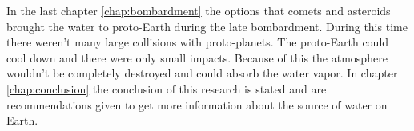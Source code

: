 In the last chapter \ref{chap:bombardment} the options that comets and asteroids brought the water to proto-Earth during the late bombardment. During this time there weren't many large collisions with proto-planets. The proto-Earth could cool down and there were only small impacts. Because of this the atmosphere wouldn't be completely destroyed and could absorb the water vapor. In chapter \ref{chap:conclusion} the conclusion of this research is stated and are recommendations given to get more information about the source of water on Earth.\\ 


